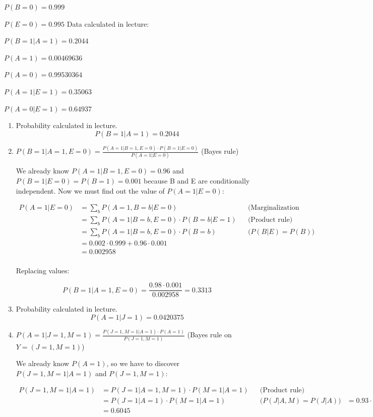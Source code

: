 \documentclass{article}
\begin{document}
$P(B=0)=0.999$

$P(E=0)=0.995$
\bigbreak
Data calculated in lecture:

$P(B=1|A=1)=0.2044$

$P(A=1)=0.00469636$

$P(A=0)=0.99530364$

$P(A=1|E=1)=0.35063$

$P(A=0|E=1)=0.64937$

\bigbreak
\begin{enumerate}[label=(\alph*)]
\item
Probability calculated in lecture.
$$P(B=1|A=1)=0.2044$$

\item
$P(B=1|A=1,E=0) = \frac{P(A=1|B=1,E=0) \cdot P(B=1|E=0)}{P(A=1|E=0)}$  (Bayes rule)

We already know $P(A=1|B=1,E=0)=0.96$ and $P(B=1|E=0)=P(B=1)=0.001$ because B and E are conditionally independent.
Now we must find out the value of $P(A=1|E=0)$:

\begin{align*}
P(A=1|E=0) & = \sum_{b}P(A=1,B=b|E=0) && \text{(Marginalization over B)}\\
& = \sum_{b}P(A=1|B=b,E=0) \cdot P(B=b|E=1) &&  \text{(Product rule)}\\
& = \sum_{b}P(A=1|B=b,E=0) \cdot P(B=b) && \text{($P(B|E)=P(B)$)}\\
& = 0.002 \cdot 0.999 + 0.96 \cdot 0.001\\
& = 0.002958\\
\end{align*}

Replacing values:

$$P(B=1|A=1,E=0) = \frac{0.98 \cdot 0.001}{0.002958} = 0.3313$$

\item
Probability calculated in lecture.
$$P(A=1|J=1)=0.0420375$$

\item
$P(A=1|J=1,M=1) = \frac{P(J=1,M=1|A=1) \cdot P(A=1)}{P(J=1,M=1)}$  (Bayes rule on $Y=(J=1,M=1)$)

We already know $P(A=1)$, so we have to discover $P(J=1,M=1|A=1)$ and $P(J=1,M=1)$:

\begin{align*}
P(J=1,M=1|A=1) & =P(J=1|A=1,M=1) \cdot P(M=1|A=1) && \text{(Product rule)}\\
& =P(J=1|A=1) \cdot P(M=1|A=1) && \text{($P(J|A,M)=P(J|A)$)}
& = 0.93 \cdot 0.65\\
& = 0.6045
\end{align*}


\end{enumerate}
\end{document}
